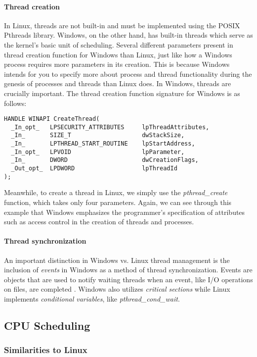 \documentclass[letterpaper,10pt,titlepage]{article}
\begin{document}
\paragraph{Thread creation}
In Linux, threads are not built-in and must be implemented using the POSIX Pthreads library. Windows, on the other hand, has built-in threads which serve as the kernel's basic unit of scheduling. Several different parameters present in thread creation function for Windows than Linux, just like how a Windows process requires more parameters in its creation. This is because Windows intends for you to specify more about process and thread functionality during the genesis of processes and threads than Linux does. In Windows, threads are crucially important. The thread creation function signature for Windows is as follows:
\begin{lstlisting}
HANDLE WINAPI CreateThread(
  _In_opt_   LPSECURITY_ATTRIBUTES     lpThreadAttributes,
  _In_       SIZE_T                    dwStackSize,
  _In_       LPTHREAD_START_ROUTINE    lpStartAddress,
  _In_opt_   LPVOID                    lpParameter,
  _In_       DWORD                     dwCreationFlags,
  _Out_opt_  LPDWORD                   lpThreadId
);
\end{lstlisting}
Meanwhile, to create a thread in Linux, we simply use the \emph{pthread\_create} function, which takes only four parameters. Again, we can see through this example that Windows emphasizes the programmer's specification of attributes such as access control in the creation of threads and processes.
\paragraph{Thread synchronization}
An important distinction in Windows vs. Linux thread management is the inclusion of \emph{events} in Windows as a method of thread synchronization. Events are objects that are used to notify waiting threads when an event, like I/O operations on files, are completed \cite{rus121}. Windows also utilizes \emph{critical sections} while Linux implements \emph{conditional variables}, like \emph{pthread\_cond\_wait}. 

\subsection{CPU Scheduling}  
\subsubsection{Similarities to Linux}
\end{document}
